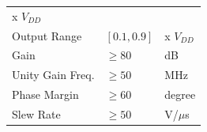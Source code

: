 \documentclass[
]{article}
\begin{document}
\begin{longtable}[]{@{}lll@{}}
\begin{minipage}[t]{0.28\columnwidth}
x \(V_{DD}\)\strut
\end{minipage}\tabularnewline
\begin{minipage}[t]{0.35\columnwidth}\raggedright
Output Range\strut
\end{minipage} & \begin{minipage}[t]{0.28\columnwidth}\raggedright
\([0.1,0.9]\)\strut
\end{minipage} & \begin{minipage}[t]{0.28\columnwidth}\raggedright
x \(V_{DD}\)\strut
\end{minipage}\tabularnewline
\begin{minipage}[t]{0.35\columnwidth}\raggedright
Gain\strut
\end{minipage} & \begin{minipage}[t]{0.28\columnwidth}\raggedright
\(\geq 80\)\strut
\end{minipage} & \begin{minipage}[t]{0.28\columnwidth}\raggedright
dB\strut
\end{minipage}\tabularnewline
\begin{minipage}[t]{0.35\columnwidth}\raggedright
Unity Gain Freq.\strut
\end{minipage} & \begin{minipage}[t]{0.28\columnwidth}\raggedright
\(\geq 50\)\strut
\end{minipage} & \begin{minipage}[t]{0.28\columnwidth}\raggedright
MHz\strut
\end{minipage}\tabularnewline
\begin{minipage}[t]{0.35\columnwidth}\raggedright
Phase Margin\strut
\end{minipage} & \begin{minipage}[t]{0.28\columnwidth}\raggedright
\(\geq 60\)\strut
\end{minipage} & \begin{minipage}[t]{0.28\columnwidth}\raggedright
degree\strut
\end{minipage}\tabularnewline
\begin{minipage}[t]{0.35\columnwidth}\raggedright
Slew Rate\strut
\end{minipage} & \begin{minipage}[t]{0.28\columnwidth}\raggedright
\(\geq 50\)\strut
\end{minipage} & \begin{minipage}[t]{0.28\columnwidth}\raggedright
V/\(\mu\)s\strut
\end{minipage}\tabularnewline

\end{longtable}
\end{document}
